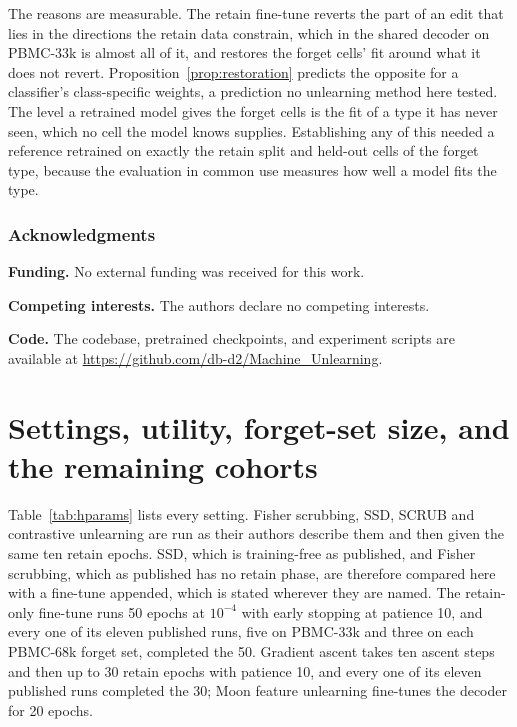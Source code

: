 \documentclass{article}
\begin{document}
The reasons are measurable. The retain fine-tune reverts the part of an edit that lies in the directions the retain data constrain, which in the shared decoder on PBMC-33k is almost all of it, and restores the forget cells' fit around what it does not revert. Proposition~\ref{prop:restoration} predicts the opposite for a classifier's class-specific weights, a prediction no unlearning method here tested. The level a retrained model gives the forget cells is the fit of a type it has never seen, which no cell the model knows supplies. Establishing any of this needed a reference retrained on exactly the retain split and held-out cells of the forget type, because the evaluation in common use measures how well a model fits the type.

\subsubsection*{Acknowledgments}
\textbf{Funding.} No external funding was received for this work.

\textbf{Competing interests.} The authors declare no competing interests.

\textbf{Code.} The codebase, pretrained checkpoints, and experiment scripts are available at \url{https://github.com/db-d2/Machine_Unlearning}.




\newpage
\appendix

\section{Settings, utility, forget-set size, and the remaining cohorts}
\label{app:utility}

Table~\ref{tab:hparams} lists every setting. Fisher scrubbing, SSD, SCRUB and contrastive unlearning are run as their authors describe them and then given the same ten retain epochs. SSD, which is training-free as published, and Fisher scrubbing, which as published has no retain phase, are therefore compared here with a fine-tune appended, which is stated wherever they are named. The retain-only fine-tune runs 50 epochs at $10^{-4}$ with early stopping at patience 10, and every one of its eleven published runs, five on PBMC-33k and three on each PBMC-68k forget set, completed the 50. Gradient ascent takes ten ascent steps and then up to 30 retain epochs with patience 10, and every one of its eleven published runs completed the 30; Moon feature unlearning fine-tunes the decoder for 20 epochs.
\end{document}
